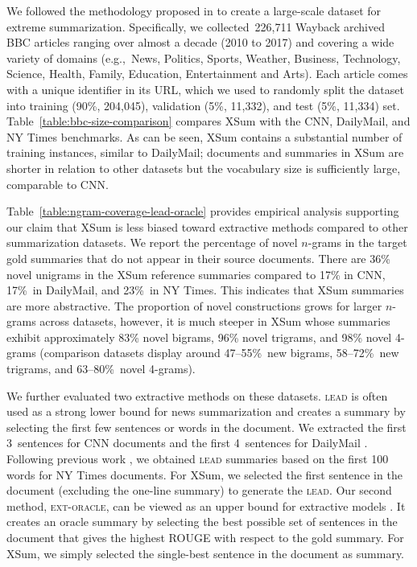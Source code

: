 \documentclass[11pt,a4paper]{article}
\begin{document}
We followed the methodology proposed in  to
create a large-scale dataset for extreme summarization. Specifically,
we collected~226,711 Wayback archived BBC articles ranging over almost
a decade (2010 to 2017) and covering a wide variety of domains
(e.g.,~News, Politics, Sports, Weather, Business, Technology, Science,
Health, Family, Education, Entertainment and Arts). Each article comes
with a unique identifier in its URL, which we used to randomly split
the dataset into training (90\%, 204,045), validation (5\%, 11,332),
and test (5\%, 11,334) set. Table~\ref{table:bbc-size-comparison}
compares XSum with the CNN, DailyMail, and NY Times benchmarks. As can be seen, XSum contains a substantial number of
training instances, similar to DailyMail; documents and summaries in
XSum are shorter in relation to other datasets but the vocabulary size
is sufficiently large, comparable to CNN.



Table~\ref{table:ngram-coverage-lead-oracle} provides empirical
analysis supporting our claim that XSum is less biased toward
extractive methods compared to other summarization datasets.  We
report the percentage of novel $n$-grams in the target gold summaries
that do not appear in their source documents.  There are 36\% novel
unigrams in the XSum reference summaries compared to 17\% in CNN,
17\%~in DailyMail, and 23\%~in NY Times. This indicates that XSum summaries are more abstractive. The
proportion of novel constructions grows for larger $n$-grams across
datasets, however, it is much steeper in XSum whose summaries exhibit
approximately 83\% novel bigrams, 96\% novel trigrams, and 98\% novel
4-grams (comparison datasets display around 47--55\%~new bigrams,
58--72\%~new trigrams, and 63--80\%~novel 4-grams).

We further evaluated two extractive methods on these datasets.
\textsc{lead} is often used as a strong lower bound for news
summarization \cite{nenkova-05} and creates a summary by selecting the
first few sentences or words in the document. We extracted the first
3~sentences for CNN documents and the first 4~sentences for DailyMail
\cite{narayan-rank18}. Following previous work
\cite{durrett-nyt-ext,paulus-socher-arxiv17}, we obtained
\textsc{lead} summaries based on the first 100 words for NY Times
documents. For XSum, we selected the first sentence
in the document (excluding the one-line summary) to generate the
\textsc{lead}. Our second method, \textsc{ext-oracle}, can be viewed
as an upper bound for extractive models
\cite{nallapati17,narayan-rank18}. It creates an oracle summary by
selecting the best possible set of sentences in the document that
gives the highest ROUGE \cite{rouge} with respect to the gold
summary. For XSum, we simply selected the single-best sentence in the
document as summary.
\end{document}
